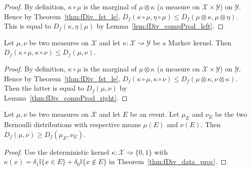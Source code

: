 \begin{proof}
By definition, $\kappa \circ \mu$ is the marginal of $\mu \otimes \kappa$ (a measure on $\mathcal X \times \mathcal Y$) on $\mathcal Y$. Hence by Theorem~\ref{thm:fDiv_fst_le}, $D_f(\kappa \circ \mu, \eta \circ \mu) \le D_f(\mu \otimes \kappa, \mu \otimes \eta)$. This is equal to $D_f(\kappa, \eta \mid \mu)$ by Lemma~\ref{lem:fDiv_compProd_left}.
\end{proof}

\begin{theorem}
  \label{thm:fDiv_data_proc}
  Let $\mu, \nu$ be two measures on $\mathcal X$ and let $\kappa : \mathcal X \rightsquigarrow \mathcal Y$ be a Markov kernel.
  Then $D_f(\kappa \circ \mu, \kappa \circ \nu) \le D_f(\mu, \nu)$.
\end{theorem}

\begin{proof}
By definition, $\kappa \circ \mu$ is the marginal of $\mu \otimes \kappa$ (a measure on $\mathcal X \times \mathcal Y$) on $\mathcal Y$. Hence by Theorem~\ref{thm:fDiv_fst_le}, $D_f(\kappa \circ \mu, \kappa \circ \nu) \le D_f(\mu \otimes \kappa, \nu \otimes \kappa)$. Then the latter is equal to $D_f(\mu, \nu)$ by Lemma~\ref{thm:fDiv_compProd_right}.
\end{proof}

\begin{corollary}
  \label{cor:data_proc_event}
  Let $\mu, \nu$ be two measures on $\mathcal X$ and let $E$ be an event. Let $\mu_E$ and $\nu_E$ be the two Bernoulli distributions with respective means $\mu(E)$ and $\nu(E)$. Then $D_f(\mu, \nu) \ge D_f(\mu_E, \nu_E)$.
\end{corollary}

\begin{proof}
Use the deterministic kernel $\kappa : \mathcal X \rightsquigarrow \{0, 1\}$ with $\kappa(x) = \delta_1 \mathbb{I}\{x \in E\} + \delta_0 \mathbb{I}\{x \notin E\}$ in Theorem~\ref{thm:fDiv_data_proc}.
\end{proof}